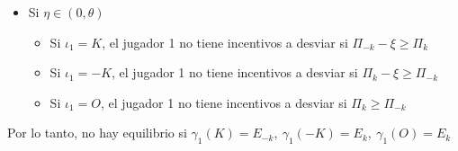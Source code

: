 {\begin{enumerate}
\begin{enumerate}
\begin{itemize}
\begin{itemize}
            \end{itemize}
        \item Si $\eta \in (0,\theta) $
            \begin{itemize}
                \item Si $ \iota_1=K  $, el jugador 1 no tiene incentivos a desviar si $ \Pi_{-k} - \xi \geq \Pi_k $
                \item Si $ \iota_1=-K $, el jugador 1 no tiene incentivos a desviar si $ \Pi_k - \xi \geq \Pi_{-k} $
                \item Si $ \iota_1=O  $, el jugador 1 no tiene incentivos a desviar si $ \Pi_k \geq \Pi_{-k} $
        \end{itemize}
    \end{itemize}
    
    Por lo tanto, no hay equilibrio si $\gamma_1(K)=E_{-k}, \ \gamma_1(-K)=E_k, \ \gamma_1(O)=E_{k}$
    \end{enumerate}
       

\end{enumerate}}
